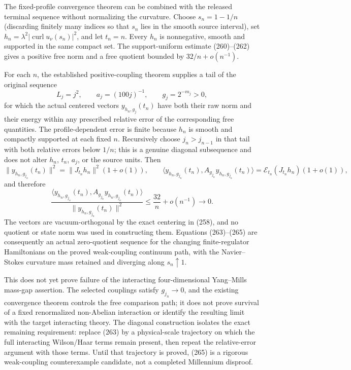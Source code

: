 The fixed-profile convergence theorem can be combined with the released terminal sequence without normalizing the curvature.  Choose $s_n=1-1/n$ (discarding finitely many indices so that $s_n$ lies in the smooth source interval), set $h_n=\lambda^2|\operatorname{curl}u_\nu(s_n)|^2$, and let $t_n=n$.  Every $h_n$ is nonnegative, smooth and supported in the same compact set.  The support-uniform estimate (260)--(262) gives a positive free norm and a free quotient bounded by $32/n+o(n^{-1})$.

For each $n$, the established positive-coupling theorem supplies a tail of the original sequence
\[
 L_j=j^2,\qquad a_j=(100j)^{-1},\qquad g_j=2^{-m_j}>0,
 \tag{263}
\]
for which the actual centered vectors $y_{h_n,g_j}(t_n)$ have both their raw norm and their energy within any prescribed relative error of the corresponding free quantities.  The profile-dependent error is finite because $h_n$ is smooth and compactly supported at each fixed $n$.  Recursively choose $j_n>j_{n-1}$ in that tail with both relative errors below $1/n$; this is a genuine diagonal subsequence and does not alter $h_n$, $t_n$, $a_j$, or the source units.  Then
\[
 \|y_{h_n,g_{j_n}}(t_n)\|^2
   =\|J_{t_n}h_n\|^2(1+o(1)),\qquad
 \langle y_{h_n,g_{j_n}}(t_n),A_{g_{j_n}}y_{h_n,g_{j_n}}(t_n)\rangle
   =\mathcal E_{t_n}(J_{t_n}h_n)(1+o(1)),
 \tag{264}
\]
and therefore
\[
 \frac{\langle y_{h_n,g_{j_n}}(t_n),A_{g_{j_n}}y_{h_n,g_{j_n}}(t_n)\rangle}
  {\|y_{h_n,g_{j_n}}(t_n)\|^2}
 \le \frac{32}{n}+o(n^{-1})\longrightarrow0.
 \tag{265}
\]
The vectors are vacuum-orthogonal by the exact centering in (258), and no quotient or state norm was used in constructing them.  Equations (263)--(265) are consequently an actual zero-quotient sequence for the changing finite-regulator Hamiltonians on the proved weak-coupling continuum path, with the Navier--Stokes curvature mass retained and diverging along $s_n\uparrow1$.

This does not yet prove failure of the interacting four-dimensional Yang--Mills mass-gap assertion.  The selected couplings satisfy $g_{j_n}\to0$, and the existing convergence theorem controls the free comparison path; it does not prove survival of a fixed renormalized non-Abelian interaction or identify the resulting limit with the target interacting theory.  The diagonal construction isolates the exact remaining requirement: replace (263) by a physical-scale trajectory on which the full interacting Wilson/Haar terms remain present, then repeat the relative-error argument with those terms.  Until that trajectory is proved, (265) is a rigorous weak-coupling counterexample candidate, not a completed Millennium disproof.

